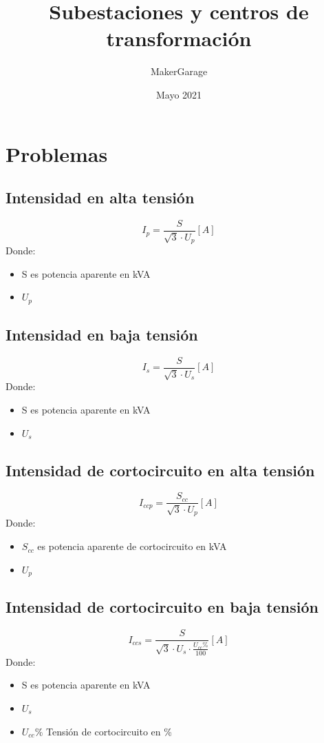 \documentclass[10pt,a4paper]{article}
\title{Subestaciones y centros de transformación}
\author{MakerGarage}
\date{Mayo 2021}
\begin{document}
\maketitle
\newpage
\tableofcontents
\newpage
\section{Problemas}
\subsection{Intensidad en alta tensión}
$$
I_p = \frac{S}{\sqrt{3} \cdot U_p} [A]
$$
Donde:
\begin{itemize}
    \item S es potencia aparente en kVA
    \item $U_p$ 
\end{itemize}
\subsection{Intensidad en baja tensión}
$$
I_s = \frac{S}{\sqrt{3} \cdot U_s} [A]
$$
Donde:
\begin{itemize}
    \item S es potencia aparente en kVA
    \item $U_s$ 
\end{itemize}

\subsection{Intensidad de cortocircuito en alta tensión}
$$
I_{ccp} = \frac{S_{cc}}{\sqrt{3} \cdot U_p} [A]
$$
Donde:
\begin{itemize}
    \item $S_{cc}$ es potencia aparente de cortocircuito en kVA
    \item $U_p$ 
\end{itemize}
\subsection{Intensidad de cortocircuito en baja tensión}
$$
I_{ccs} = \frac{ S}{\sqrt{3} \cdot U_s \cdot \frac{U_{cc}\%}{100} } [A]
$$
Donde:
\begin{itemize}
    \item S es potencia aparente en kVA
    \item $U_s$ 
    \item $U_{cc}\%$ Tensión de cortocircuito en \%
\end{itemize}
\newpage
\end{document}
